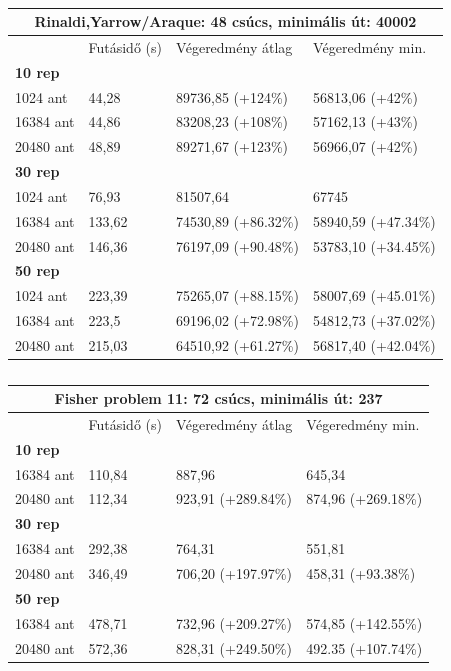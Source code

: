 \begin{table}[ht!]
	\centering
	\begin{tabular}{|p{2cm}||p{3cm}|p{3.5cm}|p{3.5cm}|}
		\hline
		\multicolumn{4}{|c|}{Rinaldi,Yarrow/Araque: 48 csúcs, minimális út: 40002} \\
		\hline
		& Futásidő (s) & Végeredmény átlag & Végeredmény min.\\
		\hline
		\textbf{10 rep} & & & \\
		1024 ant & 44,28 & 89736,85 (+124\%) & 56813,06 (+42\%) \\
		16384 ant & 44,86 & 83208,23 (+108\%) & 57162,13 (+43\%) \\
		20480 ant & 48,89 & 89271,67 (+123\%) & 56966,07 (+42\%) \\
		\hline
		\textbf{30 rep} & & & \\
		1024 ant & 76,93 & 81507,64 & 67745 \\
		16384 ant & 133,62 & 74530,89 (+86.32\%) & 58940,59 (+47.34\%) \\
		20480 ant & 146,36 & 76197,09 (+90.48\%) & 53783,10 (+34.45\%) \\
		\hline
		\textbf{50 rep} & & & \\
		1024 ant & 223,39 & 75265,07 (+88.15\%) & 58007,69 (+45.01\%) \\
		16384 ant & 223,5 & 69196,02 (+72.98\%) & 54812,73 (+37.02\%) \\
		20480 ant & 215,03 & 64510,92 (+61.27\%) & 56817,40 (+42.04\%) \\
		\hline
	\end{tabular}
	\caption{}
	\label{table:CVRP_att48}
\end{table}

\begin{table}[ht!]
	\centering
	\begin{tabular}{|p{2cm}||p{3cm}|p{3.5cm}|p{3.5cm}|}
		\hline
		\multicolumn{4}{|c|}{Fisher problem 11: 72 csúcs, minimális út: 237} \\
		\hline
		& Futásidő (s) & Végeredmény átlag & Végeredmény min.\\
		\hline
		\textbf{10 rep} & & & \\
		16384 ant & 110,84 & 887,96 & 645,34\\
		20480 ant & 112,34 & 923,91 (+289.84\%) & 874,96 (+269.18\%)\\
		\hline
		\textbf{30 rep} & & & \\
		16384 ant & 292,38 & 764,31 & 551,81 \\
		20480 ant & 346,49 & 706,20 (+197.97\%) & 458,31 (+93.38\%) \\
		\hline
		\textbf{50 rep} & & & \\
		16384 ant & 478,71 & 732,96 (+209.27\%) & 574,85 (+142.55\%)\\
		20480 ant & 572,36 & 828,31 (+249.50\%) & 492.35 (+107.74\%)\\
		\hline
	\end{tabular}
	\caption{}
	\label{table:CVRP_f72}
\end{table}








